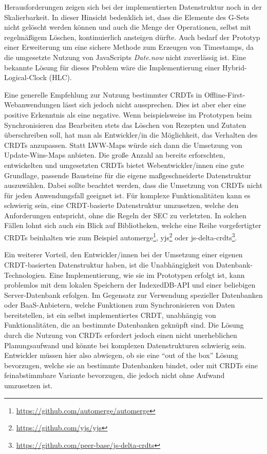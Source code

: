 \documentclass[a4paper, 12pt]{scrreprt}
\begin{document}
Herausforderungen zeigen sich bei der implementierten Datenstruktur noch in der Skalierbarkeit. In dieser Hinsicht bedenklich ist, dass die Elemente des G-Sets nicht gelöscht werden können und auch die Menge der Operationen, selbst mit regelmäßigem Löschen, kontinuierlich ansteigen dürfte. Auch bedarf der Prototyp einer Erweiterung um eine sichere Methode zum Erzeugen von Timestamps, da die umgesetzte Nutzung von JavaScripts \textit{Date.now} nicht zuverlässig ist. Eine bekannte Lösung für dieses Problem wäre die Implementierung einer Hybrid-Logical-Clock (HLC).

Eine generelle Empfehlung zur Nutzung bestimmter CRDTs in Offline-First-Webanwendungen lässt sich jedoch nicht aussprechen. Dies ist aber eher eine positive Erkenntnis als eine negative. Wenn beispielsweise im Prototypen beim Synchronisieren das Bearbeiten stets das Löschen von Rezepten und Zutaten überschreiben soll, hat man als Entwickler/in die Möglichkeit, das Verhalten des CRDTs anzupassen. Statt LWW-Maps würde sich dann die Umsetzung von Update-Wins-Maps anbieten. Die große Anzahl an bereits erforschten, entwickelten und umgesetzten CRDTs bietet Webentwickler/innen eine gute Grundlage, passende Bausteine für die eigene maßgeschneiderte Datenstruktur auszuwählen. Dabei sollte beachtet werden, dass die Umsetzung von CRDTs nicht für jeden Anwendungsfall geeignet ist. Für komplexe Funktionalitäten kann es schwierig sein, eine CRDT-basierte Datenstruktur umzusetzen, welche den Anforderungen entspricht, ohne die Regeln der \ac{SEC} zu verletzten. In solchen Fällen lohnt sich auch ein Blick auf Bibliotheken, welche eine Reihe vorgefertigter CRDTs beinhalten wie zum Beispiel automerge\footnote{\url{https://github.com/automerge/automerge}}, yjs\footnote{\url{https://github.com/yjs/yjs}} oder js-delta-crdts\footnote{\url{https://github.com/peer-base/js-delta-crdts}}. 

Ein weiterer Vorteil, den Entwickler/innen bei der Umsetzung einer eigenen CRDT-basierten Datenstruktur haben, ist die Unabhängigkeit von Datenbank-Technologien. Eine Implementierung, wie sie im Prototypen erfolgt ist, kann problemlos mit dem lokalen Speichern der IndexedDB-API und einer beliebigen Server-Datenbank erfolgen. Im Gegensatz zur Verwendung spezieller Datenbanken oder \ac{BaaS}-Anbietern, welche Funktionen zum Synchronisieren von Daten bereitstellen, ist ein selbst implementiertes CRDT, unabhängig von Funktionalitäten, die an bestimmte Datenbanken geknüpft sind. Die Lösung durch die Nutzung von CRDTs erfordert jedoch einen nicht unerheblichen Planungsaufwand und könnte bei komplexen Datenstrukturen schwierig sein. Entwickler müssen hier also abwiegen, ob sie eine \enquote{out of the box} Lösung bevorzugen, welche sie an bestimmte Datenbanken bindet, oder mit CRDTs eine feinabstimmbare Variante bevorzugen, die jedoch nicht ohne Aufwand umzusetzen ist. 
\end{document}
